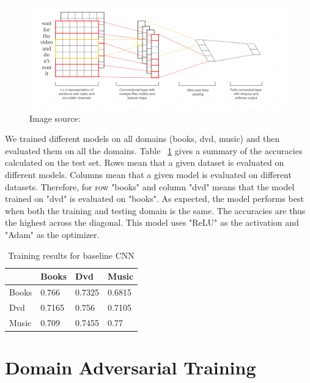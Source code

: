 \documentclass[11pt,a4paper]{article}
\begin{document}
\begin{figure}[htb]
\begin{center}
\includegraphics[width=\columnwidth]{cnn.png}
\end{center}
\caption{Image source: ~\cite{Britz}}
\label{fig:figure1}
\end{figure}

We trained different models on all domains (books, dvd, music) and then evaluated them on all the domains. Table ~\ref{cnn-table} gives a summary of the accuracies calculated on the test set. Rows mean that a given dataset is evaluated on different models. Columns mean that a given model is evaluated on different datasets. Therefore, for row "books" and column "dvd" means that the model trained on "dvd" is evaluated on "books". As expected, the model performs best when both the training and testing domain is the same. The accuracies are thus the highest across the diagonal. This model uses "ReLU" as the activation and "Adam" as the optimizer.


\begin{table}[h]
\begin{center}
\begin{tabular}{|l|l|l|l|}
\hline \bf & \bf Books & \bf Dvd & \bf Music \\ \hline
Books & 0.766 & 0.7325 & 0.6815 \\
Dvd & 0.7165 & 0.756 & 0.7105 \\
Music & 0.709 & 0.7455 & 0.77 \\
\hline
\end{tabular}
\end{center}
\caption{ Training results for baseline CNN }
\label{cnn-table}
\end{table}



\section{Domain Adversarial Training}
\end{document}
